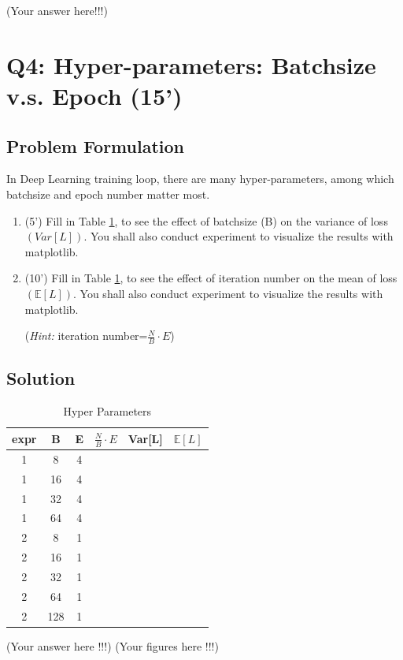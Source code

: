 \documentclass[12pt,a4paper]{article}
\theoremstyle{definition}
\begin{document}
(Your answer here!!!)

\section{Q4: Hyper-parameters: Batchsize v.s. Epoch (15')}
\subsection{Problem Formulation}

In Deep Learning training loop, there are many hyper-parameters, among which batchsize and epoch number matter most.

\begin{enumerate}
    \item (5') Fill in Table \ref{hyper-param}, to see the effect of batchsize (B) on the variance of loss $(Var[L])$. You shall also conduct experiment to visualize the results with matplotlib.
    \item (10') Fill in Table \ref{hyper-param}, to see the effect of iteration number on the mean of loss $(\mathbb{E}[L])$. You shall also conduct experiment to visualize the results with matplotlib.
    
    (\textit{Hint:} iteration number=$\frac{N}{B} \cdot E$)
\end{enumerate}

\subsection{Solution}
\begin{table}[H]
    \centering
    \begin{tabular}{c|ccc|cc}
    \toprule[1.5pt]
        expr & B & E & $\frac{N}{B} \cdot E$ & Var[L] & $\mathbb{E}[L]$ \\
        \hline
        1 & 8 & 4 & & & \\
        1 & 16 & 4 & & & \\
        1 & 32 & 4 & & & \\
        1 & 64 & 4 & & & \\
        2 & 8 & 1 & & & \\
        2 & 16 & 1 & & & \\
        2 & 32 & 1 & & & \\
        2 & 64 & 1 & & & \\
        2 & 128 & 1 & & & \\
    \bottomrule[1.5pt]
    \end{tabular}
    \caption{Hyper Parameters}
    \label{hyper-param}
\end{table}
(Your answer here !!!)
(Your figures here !!!)
\end{document}
